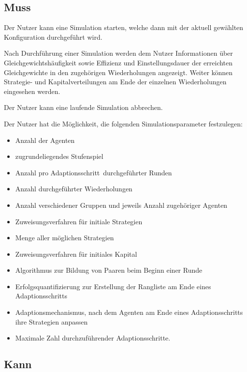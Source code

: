 \documentclass[parskip=full,11pt]{scrartcl}
\def\adapt{Adaptionsschritt}
\def\adapts{Adaptionsschritte}
\begin{document}
\subsection{Muss}


Der Nutzer kann eine Simulation starten, welche dann mit der aktuell gewählten Konfiguration durchgeführt wird.


Nach Durchführung einer Simulation werden dem Nutzer Informationen über Gleichgewichtshäufigkeit sowie Effizienz und Einstellungsdauer der erreichten Gleichgewichte in den zugehörigen Wiederholungen angezeigt. Weiter können Strategie- und Kapitalverteilungen am Ende der einzelnen Wiederholungen eingesehen werden.


Der Nutzer kann eine laufende Simulation abbrechen.


Der Nutzer hat die Möglichkeit, die folgenden Simulationsparameter festzulegen:
\begin{itemize} \itemsep -10pt
\item Anzahl der Agenten
\item zugrundeliegendes Stufenspiel
\item Anzahl pro \adapt\ durchgeführter Runden
\item Anzahl durchgeführter Wiederholungen
\item Anzahl verschiedener Gruppen und jeweils Anzahl zugehöriger Agenten
\item Zuweisungsverfahren für initiale Strategien
\item Menge aller möglichen Strategien
\item Zuweisungsverfahren für initiales Kapital
\item Algorithmus zur Bildung von Paaren beim Beginn einer Runde
\item Erfolgsquantifizierung zur Erstellung der Rangliste am Ende eines \adapt s
\item Adaptionsmechanismus, nach dem Agenten am Ende eines \adapt s ihre Strategien anpassen
\item Maximale Zahl durchzuführender \adapts.
\end{itemize}

\subsection{Kann}
\end{document}
